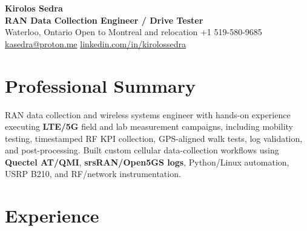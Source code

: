\documentclass[letterpaper,10pt]{article}
\begin{document}
\begin{center}
    {\Large \textbf{Kirolos Sedra}} \\
    \textbf{RAN Data Collection Engineer / Drive Tester} \\
    Waterloo, Ontario \textbar{} Open to Montreal and relocation \textbar{}
    +1 519-580-9685 \textbar{}
    \href{mailto:kasedra@proton.me}{kasedra@proton.me} \textbar{}
    \href{https://linkedin.com/in/kirolossedra}{linkedin.com/in/kirolossedra}
\end{center}

\vspace{-6pt}

\section{Professional Summary}

RAN data collection and wireless systems engineer with hands-on experience executing \textbf{LTE/5G} field and lab measurement campaigns, including mobility testing, timestamped RF KPI collection, GPS-aligned walk tests, log validation, and post-processing. Built custom cellular data-collection workflows using \textbf{Quectel AT/QMI}, \textbf{srsRAN/Open5GS logs}, Python/Linux automation, USRP B210, and RF/network instrumentation.

\section{Experience}
\end{document}

